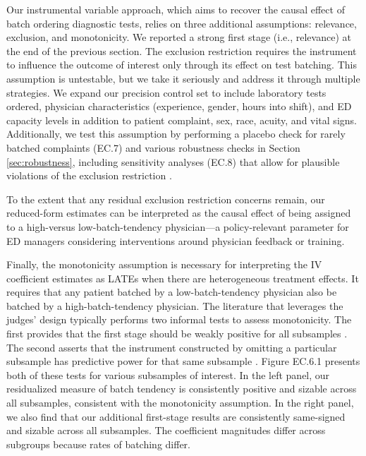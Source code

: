 \documentclass[,,blindrev]{informs}
\begin{document}
Our instrumental variable approach, which aims to recover the causal
effect of batch ordering diagnostic tests, relies on three additional
assumptions: relevance, exclusion, and monotonicity. We reported a
strong first stage (i.e., relevance) at the end of the previous section.
The exclusion restriction requires the instrument to influence the
outcome of interest only through its effect on test batching. This
assumption is untestable, but we take it seriously and address it
through multiple strategies. We expand our precision control set to
include laboratory tests ordered, physician characteristics (experience,
gender, hours into shift), and ED capacity levels in addition to patient
complaint, sex, race, acuity, and vital signs. Additionally, we test
this assumption by performing a placebo check for rarely batched
complaints (EC.7) and various robustness checks in Section
\ref{sec:robustness}, including sensitivity analyses (EC.8) that allow
for plausible violations of the exclusion restriction
\citep{conley2012plausibly}.

To the extent that any residual exclusion restriction concerns remain,
our reduced-form estimates can be interpreted as the causal effect of
being assigned to a high-versus low-batch-tendency physician---a
policy-relevant parameter for ED managers considering interventions
around physician feedback or training.

Finally, the monotonicity assumption is necessary for interpreting the
IV coefficient estimates as LATEs when there are heterogeneous treatment
effects. It requires that any patient batched by a low-batch-tendency
physician also be batched by a high-batch-tendency physician. The
literature that leverages the judges' design typically performs two
informal tests to assess monotonicity. The first provides that the first
stage should be weakly positive for all subsamples
\citep{dobbie2018effects}. The second asserts that the instrument
constructed by omitting a particular subsample has predictive power for
that same subsample \citep{bhuller2020incarceration}. Figure EC.6.1
presents both of these tests for various subsamples of interest. In the
left panel, our residualized measure of batch tendency is consistently
positive and sizable across all subsamples, consistent with the
monotonicity assumption. In the right panel, we also find that our
additional first-stage results are consistently same-signed and sizable
across all subsamples. The coefficient magnitudes differ across
subgroups because rates of batching differ.
\end{document}
